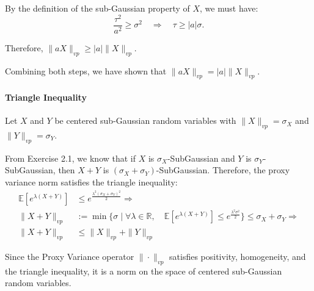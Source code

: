 \documentclass[a4 paper]{article}
\theoremstyle{boldStyle}
\theoremstyle{boldBlueStyle}
\theoremstyle{boldPurpleStyle}
\theoremstyle{boldRedStyle}
\begin{document}
\begin{enumerate}
By the definition of the sub-Gaussian property of \(X\), we must have:
\[
\frac{\tau^2}{a^2} \geq \sigma^2 \quad \Rightarrow \quad \tau \geq |a| \sigma.
\]

Therefore, $\|aX\|_{vp} \geq |a| \|X\|_{vp}$.

Combining both steps, we have shown that \(\|aX\|_{vp} = |a| \|X\|_{vp}\).



\paragraph{Triangle Inequality}
Let \(X\) and \(Y\) be centered sub-Gaussian random variables with \(\|X\|_{vp} = \sigma_X\) and \(\|Y\|_{vp} = \sigma_Y\). 

From Exercise 2.1, we know that if \(X\) is \(\sigma_X\)-SubGaussian and \(Y\) is \(\sigma_Y\)-SubGaussian, 
then \(X + Y\) is \((\sigma_X + \sigma_Y)\)-SubGaussian. Therefore, the proxy variance norm satisfies the triangle inequality:
\begin{align*}
\mathbb{E}\left[e^{\lambda (X + Y)}\right] &\leq e^{\frac{\lambda^2 (\sigma_X + \sigma_Y)^2}{2} }  \Rightarrow \\
\|X + Y\|_{vp} &:= \min\{\sigma \mid \forall \lambda \in \mathbb{R}, \quad \mathbb{E}\left[e^{\lambda (X + Y)}\right] \leq e^{\frac{\lambda^2 \sigma^2}{2}}\} \leq \sigma_X + \sigma_Y \Rightarrow \\
\|X + Y\|_{vp} &\leq \|X\|_{vp} + \|Y\|_{vp}
\end{align*}

\bigbreak


Since the Proxy Variance operator \(\|\cdot\|_{vp}\) satisfies positivity, homogeneity, and the triangle inequality, it is a norm on the space of centered sub-Gaussian random variables.











\end{enumerate}

\newpage
\end{document}
